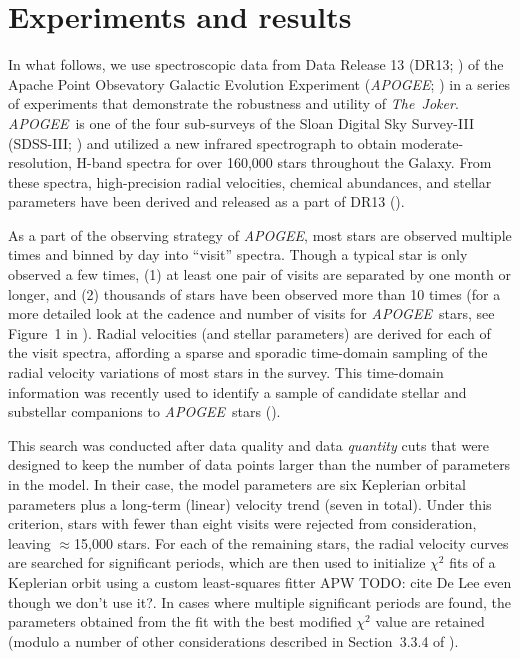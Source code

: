 \documentclass[manuscript, letterpaper]{aastex6}
\newcommand{\project}[1]{\textsl{#1}}
\newcommand{\acronym}[1]{{\small{#1}}}
\newcommand{\apogee}{\project{\acronym{APOGEE}}}
\newcommand{\samplername}{\project{The~Joker}}
\newcommand{\sectionname}{Section}
\newcommand{\figname}{Figure}
\newcommand{\todoapw}[1]{{\color{red}APW TODO: #1}}
\begin{document}
\section{Experiments and results}

In what follows, we use spectroscopic data from Data Release 13 (DR13;
\citealt{SDSS-Collaboration:2016}) of the Apache Point Obsevatory Galactic
Evolution Experiment (\apogee; \citealt{Majewski:2015}) in a series of
experiments that demonstrate the robustness and utility of \samplername.
\apogee\ is one of the four sub-surveys of the Sloan Digital Sky Survey-III
(SDSS-III; \citealt{Eisenstein:2011}) and utilized a new infrared spectrograph
to obtain moderate-resolution, H-band spectra for over 160,000 stars throughout
the Galaxy.
From these spectra, high-precision radial velocities, chemical abundances, and
stellar parameters have been derived and released as a part of DR13
(\citealt{Holtzman:2015,Nidever:2015}).

As a part of the observing strategy of \apogee, most stars are observed
multiple times and binned by day into ``visit'' spectra.
Though a typical star is only observed a few times, (1) at least one pair of
visits are separated by one month or longer, and (2) thousands of stars have
been observed more than 10 times (for a more detailed look at the cadence and
number of visits for \apogee\ stars, see \figname~1 in \citealt{Troup:2016}).
Radial velocities (and stellar parameters) are derived for each of the visit
spectra, affording a sparse and sporadic time-domain sampling of the radial
velocity variations of most stars in the survey.
This time-domain information was recently used to identify a sample of
candidate stellar and substellar companions to \apogee\ stars
(\citealt{Troup:2016}).

This search was conducted after data quality and data \emph{quantity} cuts that
were designed to keep the number of data points larger than the number of
parameters in the model.
In their case, the model parameters are six Keplerian orbital parameters plus a
long-term (linear) velocity trend (seven in total).
Under this criterion, stars with fewer than eight visits were rejected from
consideration, leaving $\approx$15,000 stars.
For each of the remaining stars, the radial velocity curves are searched for
significant periods, which are then used to initialize $\chi^2$ fits of a
Keplerian orbit using a custom least-squares fitter \todoapw{cite De Lee even
though we don't use it?}.
In cases where multiple significant periods are found, the parameters obtained
from the fit with the best modified $\chi^2$ value are retained (modulo a
number of other considerations described in \sectionname~3.3.4 of
\citealt{Troup:2016}).
\end{document}
